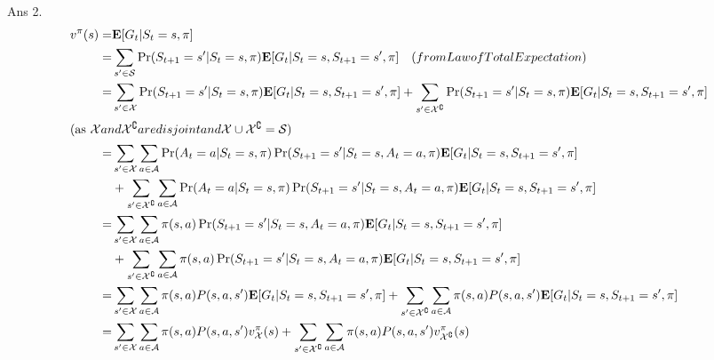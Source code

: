 \documentclass[]{article}
\begin{document}
\begin{enumerate}
	{
		\color{blue}
			Ans 2. \begin{align}
        				v^\pi(s)=& \mathbf{E}[G_t | S_t = s, \pi] \\
				=& \sum_{s' \in \mathcal S} \Pr(S_{t+1} = s' | S_t = s, \pi) \mathbf{E}[G_t | S_t = s, S_{t+1} = s', \pi] \quad  (from Law of Total Expectation) \\
				=& \sum_{s' \in \mathcal X} \Pr(S_{t+1} = s' | S_t = s, \pi) \mathbf{E}[G_t | S_t = s, S_{t+1} = s', \pi] + \sum_{s' \in \mathcal  X^\complement} \Pr(S_{t+1} = s' | S_t = s, \pi) \mathbf{E}[G_t | S_t = s, S_{t+1} = s', \pi] \\
\intertext{(as $\mathcal X and \mathcal X^\complement are disjoint and \mathcal X \cup \mathcal X^\complement = \mathcal S$)}
				=& \sum_{s' \in \mathcal X} \sum_{a \in \mathcal A} \Pr(A_t = a | S_t = s, \pi) \Pr(S_{t+1} = s' | S_t = s, A_t = a, \pi) \mathbf{E}[G_t | S_t = s, S_{t+1} = s', \pi] \\
				& + \sum_{s' \in \mathcal  X^\complement} \sum_{a \in \mathcal A} \Pr(A_t = a | S_t = s, \pi) \Pr(S_{t+1} = s' | S_t = s, A_t = a, \pi) \mathbf{E}[G_t | S_t = s, S_{t+1} = s', \pi] \\
				=& \sum_{s' \in \mathcal X} \sum_{a \in \mathcal A} \pi(s, a) \Pr(S_{t+1} = s' | S_t = s, A_t = a, \pi) \mathbf{E}[G_t | S_t = s, S_{t+1} = s', \pi] \\
				& + \sum_{s' \in \mathcal  X^\complement} \sum_{a \in \mathcal A} \pi(s, a) \Pr(S_{t+1} = s' | S_t = s, A_t = a, \pi) \mathbf{E}[G_t | S_t = s, S_{t+1} = s', \pi] \\
				=& \sum_{s' \in \mathcal X} \sum_{a \in \mathcal A} \pi(s, a) P(s, a, s') \mathbf{E}[G_t | S_t = s, S_{t+1} = s', \pi] + \sum_{s' \in \mathcal  X^\complement} \sum_{a \in \mathcal A} \pi(s, a) P(s, a, s') \mathbf{E}[G_t | S_t = s, S_{t+1} = s', \pi] \\
				=& \sum_{s' \in \mathcal X} \sum_{a \in \mathcal A} \pi(s, a) P(s, a, s') v^\pi_{\mathcal  X}(s) + \sum_{s' \in \mathcal  X^\complement} \sum_{a \in \mathcal A} \pi(s, a) P(s, a, s') v^\pi_{\mathcal  X^\complement}(s)
				\end{align}
	}


\end{enumerate}
\end{document}
